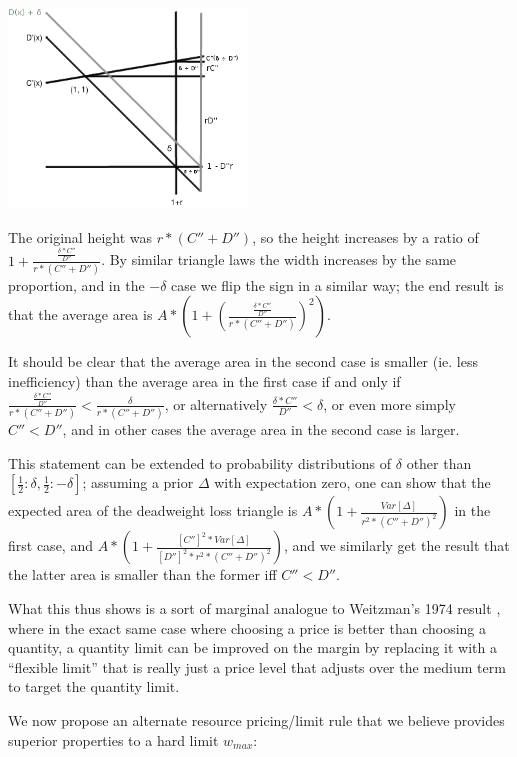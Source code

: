 \documentclass[12pt, final]{article}
\begin{document}
\begin{center}
\includegraphics[width=2.5in]{Triangle3.png} \\
\end{center}

The original height was $r * (C'' + D'')$, so the height increases by a ratio of $1 + \frac{\frac{\delta * C''}{D''}}{r * (C'' + D'')}$. By similar triangle laws the width increases by the same proportion, and in the $-\delta$ case we flip the sign in a similar way; the end result is that the average area is $A * (1 + (\frac{\frac{\delta * C''}{D''}}{r * (C'' + D'')})^2)$.

It should be clear that the average area in the second case is smaller (ie. less inefficiency) than the average area in the first case if and only if $\frac{\frac{\delta * C''}{D''}}{r * (C'' + D'')} < \frac{\delta}{r * (C'' + D'')}$, or alternatively $\frac{\delta * C''}{D''} < \delta$, or even more simply $C'' < D''$, and in other cases the average area in the second case is larger.

This statement can be extended to probability distributions of $\delta$ other than $[\frac{1}{2}: \delta, \frac{1}{2}: -\delta]$; assuming a prior $\Delta$ with expectation zero, one can show that the expected area of the deadweight loss triangle is $A * (1 + \frac{Var[\Delta]}{r^2 * (C'' + D'')^2})$ in the first case, and $A * (1 + \frac{[C'']^2 * Var[\Delta]}{[D'']^2 * r^2 * (C'' + D'')^2})$, and we similarly get the result that the latter area is smaller than the former iff $C'' < D''$.

What this thus shows is a sort of marginal analogue to Weitzman's 1974 result \cite{weitzman1974prices}, where in the exact same case where choosing a price is better than choosing a quantity, a quantity limit can be improved on the margin by replacing it with a ``flexible limit'' that is really just a price level that adjusts over the medium term to target the quantity limit.

We now propose an alternate resource pricing/limit rule that we believe provides superior properties to a hard limit $w_{max}$:
\end{document}

